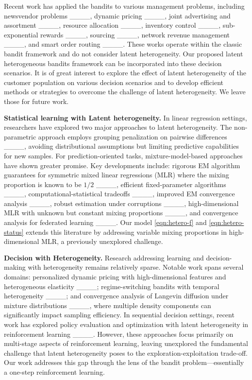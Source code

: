 Recent work has applied the bandits to various management problems, including newsvendor problems ____, dynamic pricing ____, joint advertising and assortment ____, resource allocation ____, inventory control ____, sub-exponential rewards ____, sourcing ____, network revenue management ____, and smart order routing ____. These works operate within the classic bandit framework and do not consider latent heterogeneity. Our proposed latent heterogeneous bandits framework can be incorporated into these decision scenarios. It is of great interest to explore the effect of latent heterogeneity of the customer population on various decision scenarios and to develop efficient methods or strategies to overcome the challenge of latent heterogeneity. We leave those for future work.

\smallskip
\noindent
\textbf{Statistical learning with Latent heterogeneity.}
In linear regression settings, researchers have explored two major approaches to latent heterogeneity. The non-parametric approach employs grouping penalization on pairwise differences ____, avoiding distributional assumptions but limiting predictive capabilities for new samples. For prediction-oriented tasks, mixture-model-based approaches have shown greater promise. Key developments include: rigorous EM algorithm guarantees for symmetric mixed linear regressions (MLR) where the mixing proportion is known to be $1/2$ ____, efficient fixed-parameter algorithms ____, computational-statistical tradeoffs ____, improved EM convergence analysis ____, robust estimation under corruptions ____, high-dimensional MLR with unknown but constant mixing proportions ____, and convergence analysis for federated learning ____. Our model \eqref{eqn:hetero-f} and \eqref{eqn:hetero-status} extends this literature by addressing variable mixing proportions in high-dimensional MLR, a previously unexplored challenge.

\smallskip
\noindent
\textbf{Decision with Heterogeneity.}
Research addressing learning and decision-making with heterogeneity remains relatively sparse. Notable work spans several domains: personalized dynamic pricing with high-dimensional features and heterogeneous elasticity ____; regime-switching bandits with temporal heterogeneity ____; and convergence analysis of Langevin diffusion under mixture distributions ____, where multiple density components can significantly impact sampling efficiency. In sequential decision settings, recent work has explored policy evaluation and optimization with latent heterogeneity in reinforcement learning ____. However, these approaches focus primarily on multi-stage aspects of reinforcement learning, leaving unexplored the fundamental challenge that latent heterogeneity poses to the exploration-exploitation trade-off. Our work addresses this gap through the lens of the bandit problem—essentially a one-step reinforcement learning.
